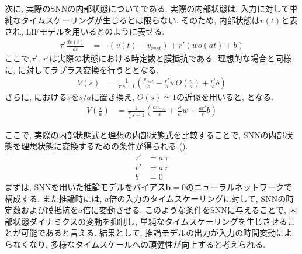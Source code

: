 次に, 実際のSNNの内部状態についてである.
実際の内部状態は, 入力に対して単純なタイムスケーリングが生じるとは限らない.
そのため, 内部状態は$v\left(t\right)$と表され, LIFモデルを用いるとのように表せる.
\begin{equation}
    \begin{split}
        \tau' \frac{dv\left(t\right)}{dt} &= -\left(v\left(t\right)-v_{rest}\right) + r'\left(w o\left(at\right) + b\right)
    \end{split}
    \label{sec2:eq:actual}
\end{equation}
ここで,$\tau',~r'$は実際の状態における時定数と膜抵抗である.
理想的な場合と同様に, に対してラプラス変換を行うととなる.
\begin{equation}
    \begin{split}
        V\left(s\right) &= \frac{1}{\tau' s+1}\left(\frac{v_{rest}}{s}+\frac{r'}{a} w O\left(\frac{s}{a}\right)+\frac{r'}{s}b\right)
    \end{split}
    \label{sec2:eq:actual_laplace}
\end{equation}
さらに, における$s$を$s/a$に置き換え, $O\left(s\right)\simeq1$の近似を用いると, となる.
\begin{equation}
    \begin{split}
        V\left(\frac{s}{a}\right) &= \frac{1}{\frac{\tau'}{a} s+1}\left(\frac{av_{rest}}{s}+\frac{r'}{a} w+\frac{a r'}{s}b\right)
    \end{split}
    \label{sec2:eq:actual_laplace2}
\end{equation}

ここで, 実際の内部状態式と理想の内部状態式を比較することで, SNNの内部状態を理想状態に変換するための条件が得られる ().
\begin{equation}
    \begin{split}
        \tau'&=a ~\tau\\
        r'&=a~r \\
        b&=0
    \end{split}
    \label{sec2:eq:condition}
\end{equation}
まずは, SNNを用いた推論モデルをバイアス$\bm{b}=0$のニューラルネットワークで構成する.
また推論時には, $a$倍の入力のタイムスケーリングに対して, SNNの時定数および膜抵抗を$a$倍に変動させる.
このような条件をSNNに与えることで, 内部状態ダイナミクスの変動を抑制し, 単純なタイムスケーリングを生じさせることが可能であると言える.
結果として, 推論モデルの出力が入力の時間変動によらなくなり, 多様なタイムスケールへの頑健性が向上すると考えられる.
